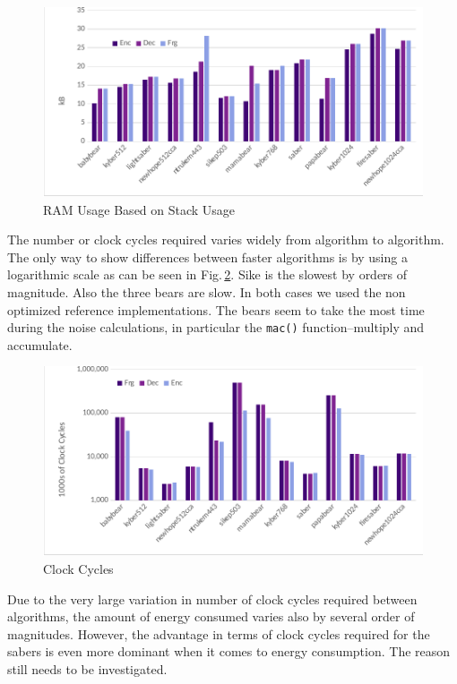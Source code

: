 \documentclass[10pt]{article}
\begin{document}
\begin{figure}[ht]
    \centering
    \includegraphics[scale=0.8]{./figures/ram.pdf}
    \caption{RAM Usage Based on Stack Usage}
    \label{fig:ram}
\end{figure}

The number or clock cycles required varies widely from algorithm to algorithm. The
only way to show differences between faster algorithms is by using a logarithmic scale
as can be seen in Fig.\,\ref{fig:clock}. Sike is the slowest by orders of magnitude.
Also the three bears are slow. In both cases we used the non optimized reference 
implementations. The bears seem to take the most time during the noise calculations,
in particular the \texttt{mac()} function--multiply and accumulate.

\begin{figure}[ht]
    \centering
    \includegraphics[scale=0.8]{./figures/clock.pdf}
    \caption{Clock Cycles}
    \label{fig:clock}
\end{figure}

Due to the very large variation in number of clock cycles required between algorithms, 
the amount of energy consumed varies also by several order of magnitudes. However,
the advantage in terms of clock cycles required for the sabers is even more dominant
when it comes to energy consumption. The reason still needs to be investigated.
\end{document}
